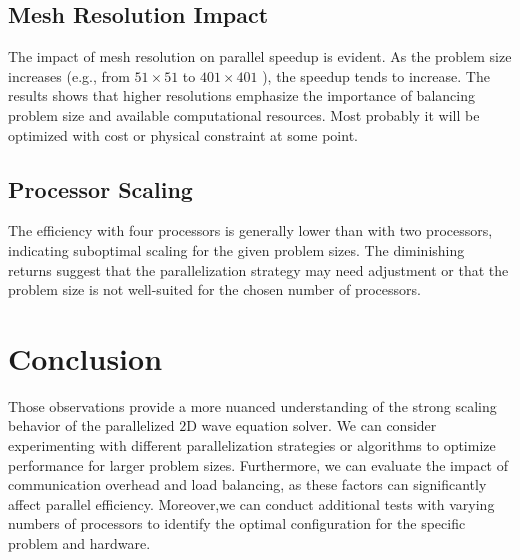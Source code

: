 \documentclass[10pt]{article}
\begin{document}
\subsection{Mesh Resolution Impact}
The impact of mesh resolution on parallel speedup is evident. As the problem size increases (e.g., from $51 \times 51$ to $401 \times 401$ ), the speedup tends to increase. The results shows that higher resolutions emphasize the importance of balancing problem size and available computational resources. Most probably it will be optimized with cost or physical constraint at some point.

\subsection{Processor Scaling}
The efficiency with four processors is generally lower than with two processors, indicating suboptimal scaling for the given problem sizes. The diminishing returns suggest that the parallelization strategy may need adjustment or that the problem size is not well-suited for the chosen number of processors.

\section{Conclusion}
Those observations provide a more nuanced understanding of the strong scaling behavior of the parallelized $2 \mathrm{D}$ wave equation solver. We can consider experimenting with different parallelization strategies or algorithms to optimize performance for larger problem sizes. Furthermore, we can evaluate the impact of communication overhead and load balancing, as these factors can significantly affect parallel efficiency. Moreover,we can conduct additional tests with varying numbers of processors to identify the optimal configuration for the specific problem and hardware.
\end{document}
